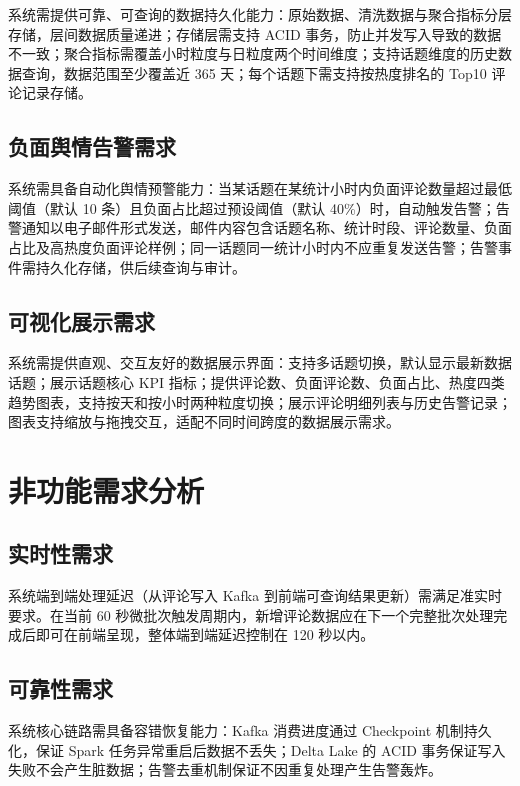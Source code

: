 系统需提供可靠、可查询的数据持久化能力：原始数据、清洗数据与聚合指标分层存储，层间数据质量递进；存储层需支持 ACID 事务，防止并发写入导致的数据不一致；聚合指标需覆盖小时粒度与日粒度两个时间维度；支持话题维度的历史数据查询，数据范围至少覆盖近 365 天；每个话题下需支持按热度排名的 Top10 评论记录存储。

\subsection{负面舆情告警需求}

系统需具备自动化舆情预警能力：当某话题在某统计小时内负面评论数量超过最低阈值（默认 10 条）且负面占比超过预设阈值（默认 40\%）时，自动触发告警；告警通知以电子邮件形式发送，邮件内容包含话题名称、统计时段、评论数量、负面占比及高热度负面评论样例；同一话题同一统计小时内不应重复发送告警；告警事件需持久化存储，供后续查询与审计。

\subsection{可视化展示需求}

系统需提供直观、交互友好的数据展示界面：支持多话题切换，默认显示最新数据话题；展示话题核心 KPI 指标；提供评论数、负面评论数、负面占比、热度四类趋势图表，支持按天和按小时两种粒度切换；展示评论明细列表与历史告警记录；图表支持缩放与拖拽交互，适配不同时间跨度的数据展示需求。

\section{非功能需求分析}

\subsection{实时性需求}

系统端到端处理延迟（从评论写入 Kafka 到前端可查询结果更新）需满足准实时要求。在当前 60 秒微批次触发周期内，新增评论数据应在下一个完整批次处理完成后即可在前端呈现，整体端到端延迟控制在 120 秒以内。

\subsection{可靠性需求}

系统核心链路需具备容错恢复能力：Kafka 消费进度通过 Checkpoint 机制持久化，保证 Spark 任务异常重启后数据不丢失；Delta Lake 的 ACID 事务保证写入失败不会产生脏数据；告警去重机制保证不因重复处理产生告警轰炸。

